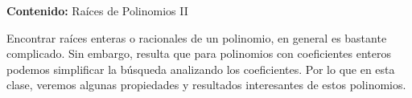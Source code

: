 {\Large\textbf{Contenido:} Raíces de Polinomios II}

Encontrar raíces enteras o racionales de un polinomio, en general es bastante complicado.
Sin embargo, resulta que para polinomios con coeficientes enteros podemos simplificar la búsqueda analizando los coeficientes.
Por lo que en esta clase, veremos algunas propiedades y resultados interesantes de estos polinomios.